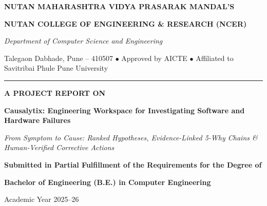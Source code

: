 \documentclass[12pt,a4paper,oneside]{report}
\newcommand{\projecttitle}{Causalytix: Engineering Workspace for Investigating Software and Hardware Failures}
\begin{document}

\begin{titlepage}
\centering
\vspace*{0.2cm}
{\large \textbf{NUTAN MAHARASHTRA VIDYA PRASARAK MANDAL'S}}\par
\vspace{0.2cm}
{\Large \textbf{NUTAN COLLEGE OF ENGINEERING \& RESEARCH (NCER)}}\par
\vspace{0.1cm}
{\normalsize \textit{Department of Computer Science and Engineering}}\par
\vspace{0.1cm}
{\footnotesize Talegaon Dabhade, Pune -- 410507 $\bullet$ Approved by AICTE $\bullet$ Affiliated to Savitribai Phule Pune University}\par
\hrule\vspace{0.3cm}
\vspace{0.3cm}
\begin{center}
\end{center}
\vspace{0.3cm}

{\large \textbf{A PROJECT REPORT ON}}\par
\vspace{0.4cm}
{\LARGE \textbf{\projecttitle}}\par
\vspace{0.2cm}
{\large \textit{From Symptom to Cause: Ranked Hypotheses, Evidence-Linked 5-Why Chains \& Human-Verified Corrective Actions}}\par
\vspace{0.5cm}
{\normalsize \textbf{Submitted in Partial Fulfillment of the Requirements for the Degree of}}\par
\vspace{0.15cm}
{\large \textbf{Bachelor of Engineering (B.E.) in Computer Engineering}}\par
\vspace{0.15cm}
{\normalsize Academic Year 2025--26}\par
\vspace{0.6cm}


\end{titlepage}
\end{document}
